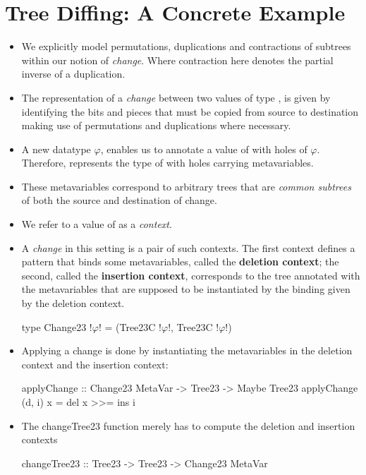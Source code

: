 \section{Tree Diffing: A Concrete Example}
\begin{itemize}
    \item We explicitly model permutations, duplications and contractions of subtrees within our notion of \textit{change}. Where contraction here denotes the partial inverse of a duplication.
    \item The representation of a \textit{change} between two values of type , is given by identifying the bits and pieces that must be copied from source to destination making use of permutations and duplications where necessary.
    \item A new datatype  $\varphi$, enables us to annotate a value of  with holes of $\varphi$. Therefore,  represents the type of  with holes carrying metavariables.
    \item These metavariables correspond to arbitrary trees that are \textit{common subtrees} of both the source and destination of change.
    \item We refer to a value of  as a \textit{context}.
    \item A \textit{change} in this setting is a pair of such contexts. The first context defines a pattern that binds some metavariables, called the \textbf{deletion context}; the second, called the \textbf{insertion context}, corresponds to the tree annotated with the metavariables that are supposed to be instantiated by the binding given by the deletion context.
    \begin{haskell}
        type Change23 !$\varphi$! = (Tree23C !$\varphi$!, Tree23C !$\varphi$!)
    \end{haskell}
    \item Applying a change is done by instantiating the metavariables in the deletion context and the insertion context:
    \begin{haskell}
        applyChange :: Change23 MetaVar -> Tree23 -> Maybe Tree23
        applyChange (d, i) x = del x >>= ins i
    \end{haskell}
    \item The changeTree23 function merely has to compute the deletion and insertion contexts
    \begin{haskell}
        changeTree23 :: Tree23 -> Tree23 -> Change23 MetaVar

\end{haskell}
\end{itemize}
